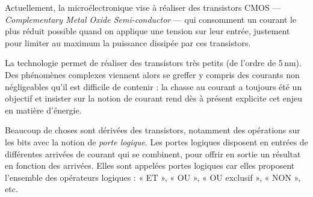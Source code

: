 

Actuellement, la microélectronique vise à réaliser des transistors CMOS --- \textit{Complementary Metal Oxide Semi-conductor} --- qui consom\-ment un courant le plus réduit possible quand on applique une tension sur leur entrée, justement pour limiter au maximum la puissance dissipée par ces transistors. 

La technologie permet de réaliser des transistors très petits (de l'ordre de 5\,nm). Des phénomènes complexes viennent alors se greffer y compris des courants non négligeables qu'il est difficile de contenir :  la chasse au courant a toujours été un objectif et insister sur la notion de courant rend dès à présent explicite cet enjeu en matière d'énergie.

Beaucoup de choses sont dérivées des transistors, notamment des opérations sur les bits avec la notion de \emph{porte logique}. Les portes logiques disposent en entrées de différentes arrivées de courant qui se combinent, pour offrir en sortie un résultat en fonction des arrivées. Elles sont appelées portes logiques car elles proposent l'ensemble des opérateurs logiques : « ET », « OU », « OU exclusif », « NON », etc.

